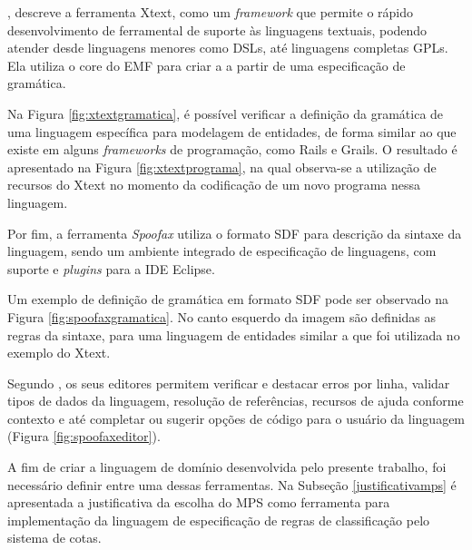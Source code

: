 , descreve a ferramenta Xtext, como um \textit{framework} que permite o rápido desenvolvimento de ferramental de suporte às linguagens textuais, podendo atender desde linguagens menores como \gls{DSL}s, até linguagens completas \gls{GPL}s. Ela utiliza o core do \gls{EMF} para criar a  a partir de uma especificação de gramática. 

Na Figura \ref{fig:xtextgramatica}, é possível verificar a definição da gramática de uma linguagem específica para modelagem de entidades, de forma similar ao que existe em alguns \textit{frameworks} de programação, como Rails e Grails. O resultado é apresentado na Figura \ref{fig:xtextprograma}, na qual observa-se a utilização de recursos do Xtext no momento da codificação de um novo programa nessa linguagem.





\newpage
Por fim, a ferramenta \textit{Spoofax} utiliza o formato \gls{SDF} para descrição da sintaxe da linguagem, sendo um ambiente integrado de especificação de linguagens, com suporte e \textit{plugins} para a \gls{IDE} Eclipse. 

Um exemplo de definição de gramática em formato \gls{SDF} pode ser observado na Figura \ref{fig:spoofaxgramatica}. No canto esquerdo da imagem são definidas as regras da sintaxe, para uma linguagem de entidades similar a que foi utilizada no exemplo do Xtext. 




Segundo , os seus editores permitem verificar e destacar erros por linha, validar tipos de dados da linguagem, resolução de referências, recursos de ajuda conforme contexto e até completar ou sugerir opções de código para o usuário da linguagem (Figura \ref{fig:spoofaxeditor}). 



A fim de criar a linguagem de domínio desenvolvida pelo presente trabalho, foi necessário definir entre uma dessas ferramentas. Na Subseção \ref{justificativamps} é apresentada a justificativa da escolha do \gls{MPS} como ferramenta para implementação da linguagem de especificação de regras de classificação pelo sistema de cotas.